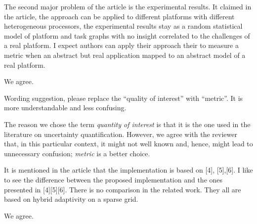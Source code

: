 \begin{reviewer}
The second major problem of the article is the experimental results. It claimed
in the article, the approach can be applied to different platforms with
different heterogeneous processors, the experimental results stay as a random
statistical model of platform and task graphs with no insight correlated to the
challenges of a real platform. I expect authors can apply their approach their
to measure a metric when an abstract but real application mapped to an abstract
model of a real platform.
\end{reviewer}

\begin{authors}
We agree.

\begin{actions}
\end{actions}
\end{authors}

\begin{reviewer}
Wording suggestion, please replace the ``quality of interest'' with ``metric''.
It is more understandable and less confusing.
\end{reviewer}

\begin{authors}
The reason we chose the term \emph{quantity of interest} is that it is the one
used in the literature on uncertainty quantification. However, we agree with the
reviewer that, in this particular context, it might not well known and, hence,
might lead to unnecessary confusion; \emph{metric} is a better choice.

\begin{actions}
\end{actions}
\end{authors}

\begin{reviewer}
It is mentioned in the article that the implementation is  based on [4],
[5],[6]. I like to see the difference between the proposed implementation and
the ones presented in [4][5][6]. There is no comparison in the related work.
They all are based on hybrid adaptivity on a sparse grid.
\end{reviewer}

\begin{authors}
We agree.

\begin{actions}
\end{actions}
\end{authors}

